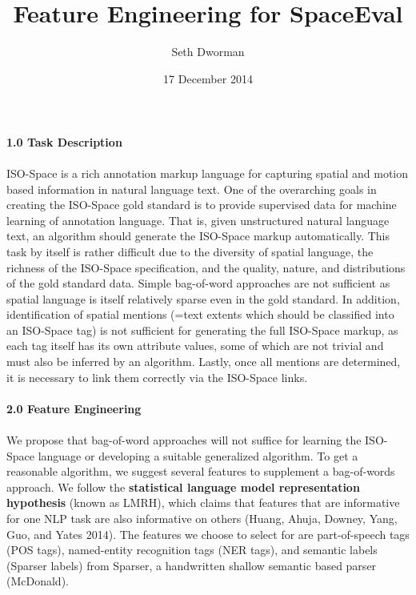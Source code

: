 \documentclass{article}
\title{Feature Engineering for SpaceEval}
\author{Seth Dworman}
\date{17 December 2014}
\begin{document}
\maketitle
$_{}$
\def\checkmark{\tikz\fill[scale=0.4](0,.35) -- (.25,0) -- (1,.7) -- (.25,.15) -- cycle;}
\newenvironment{attributes}
{\medskip\medskip
 \begin{tabular}{|l|l|}
 \hline} 
{\hline
 \end{tabular}
 \medskip\medskip}
 \newenvironment{zattributes}
{\medskip\medskip
 \begin{tabular}{|l|l|l|l|l|}
 \hline} 
{\hline
 \end{tabular}
 \medskip\medskip}
\\
{\large {\bf 1.0 Task Description}}
\\
\\
ISO-Space is a rich annotation markup language for capturing spatial and motion based information in natural language text.  One of the overarching goals in creating the ISO-Space gold standard is to provide supervised data for machine learning of annotation language.  That is, given unstructured natural language text, an algorithm should generate the ISO-Space markup automatically.  This task by itself is rather difficult due to the diversity of spatial language, the richness of the ISO-Space specification, and the quality, nature, and distributions of the gold standard data.  Simple bag-of-word approaches are not sufficient as spatial language is itself relatively sparse even in the gold standard.  In addition, identification of spatial mentions (=text extents which should be classified into an ISO-Space tag) is not sufficient for generating the full ISO-Space markup, as each tag itself has its own attribute values, some of which are not trivial and must also be inferred by an algorithm.  Lastly, once all mentions are determined, it is necessary to link them correctly via the ISO-Space links.  
\\
\\
{\large {\bf 2.0 Feature Engineering}}
\\ \\
We propose that bag-of-word approaches will not suffice for learning the ISO-Space language or developing a suitable generalized algorithm.  To get a reasonable algorithm, we suggest several features to supplement a bag-of-words approach.  We follow the {\bf statistical language model representation hypothesis} (known as LMRH), which claims that features that are informative for one NLP task are also informative on others (Huang, Ahuja, Downey, Yang, Guo, and Yates 2014).  The features we choose to select for are part-of-speech tags (POS tags), named-entity recognition tags (NER tags), and semantic labels (Sparser labels) from Sparser, a handwritten shallow semantic based parser (McDonald).  
\end{document}
